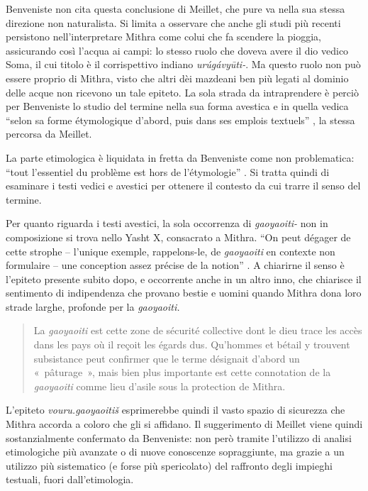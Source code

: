 \documentclass[output=paper]{langsci/langscibook}
\begin{document}
Benveniste non cita questa conclusione di Meillet, che pure va nella sua stessa direzione non naturalista. Si limita a osservare che anche gli studi più recenti persistono nell’interpretare Mithra come colui che fa scendere la pioggia, assicurando così l’acqua ai campi: lo stesso ruolo che doveva avere il dio vedico Soma, il cui titolo è il corrispettivo indiano \textit{urúgávyūti{}-}. Ma questo ruolo non può essere proprio di Mithra, visto che altri dèi mazdeani ben più legati al dominio delle acque non ricevono un tale epiteto. La sola strada da intraprendere è perciò per Benveniste lo studio del termine nella sua forma avestica e in quella vedica “selon sa forme étymologique d'abord, puis dans ses emplois textuels” \citep[278]{benveniste_mithra_2015}, la stessa percorsa da Meillet. 

La parte etimologica è liquidata in fretta da Benveniste come non problematica: “tout l’essentiel du problème est hors de l’étymologie” \citep[278]{benveniste_mithra_2015}. Si tratta quindi di esaminare i testi vedici e avestici per ottenere il contesto da cui trarre il senso del termine.

Per quanto riguarda i testi avestici, la sola occorrenza di \textit{gaoyaoiti-} non in composizione si trova nello Yasht X, consacrato a Mithra. “On peut dégager de cette strophe – l’unique exemple, rappelons-le, de \textit{gaoyaoiti} en contexte non formulaire – une conception assez précise de la notion” \citep[281]{benveniste_mithra_2015}. A chiarirne il senso è l’epiteto presente subito dopo, e occorrente anche in un altro inno, che chiarisce il sentimento di indipendenza che provano bestie e uomini quando Mithra dona loro strade larghe, profonde per la \textit{gaoyaoiti.}

\begin{quote}
    La \textit{gaoyaoiti} est cette zone de sécurité collective dont le dieu trace les accès dans les pays où il reçoit les égards dus. Qu’hommes et bétail y trouvent subsistance peut confirmer que le terme désignait d’abord un «~pâturage~», mais bien plus importante est cette connotation de la \textit{gaoyaoiti} comme lieu d’asile sous la protection de Mithra. \citep[281]{benveniste_mithra_2015}
\end{quote}

L’epiteto \textit{vouru.gaoyaoitiš} esprimerebbe quindi il vasto spazio di sicurezza che Mithra accorda a coloro che gli si affidano. Il suggerimento di Meillet viene quindi sostanzialmente confermato da Benveniste: non però tramite l’utilizzo di analisi etimologiche più avanzate o di nuove conoscenze sopraggiunte, ma grazie a un utilizzo più sistematico (e forse più spericolato) del raffronto degli impieghi testuali, fuori dall’etimologia.
\end{document}
